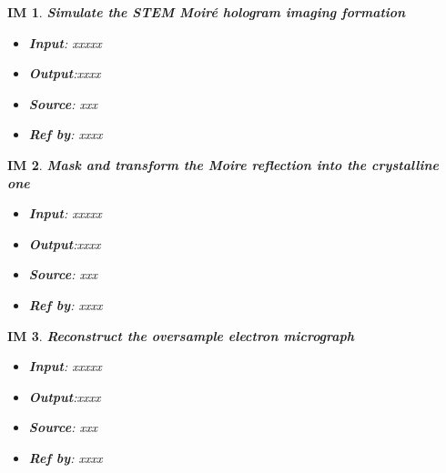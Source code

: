 \documentclass[12pt]{article}
\newtheorem{IM}{IM}
\begin{document}
\begin{IM}
\label{IM_3}
\noindent\colorbox{shadecolorIM}{\normalfont \textbf{Simulate the STEM Moir{\'e} hologram imaging formation}}
\normalfont
\begin{itemize}
\item \textbf{Input}: xxxxx
\item \textbf{Output}:xxxx

\item \textbf{Source}: xxx
\item \textbf{Ref by}: xxxx
\end{itemize}
\end{IM}

\begin{IM}
\label{IM_4}
\noindent\colorbox{shadecolorIM}{\normalfont \textbf{Mask and transform the Moire reflection into the crystalline one}}
\normalfont
\begin{itemize}
\item \textbf{Input}: xxxxx
\item \textbf{Output}:xxxx

\item \textbf{Source}: xxx
\item \textbf{Ref by}: xxxx
\end{itemize}
\end{IM}

\begin{IM}
\label{IM_5}
\noindent\colorbox{shadecolorIM}{\normalfont \textbf{Reconstruct the oversample electron micrograph}}
\normalfont
\begin{itemize}
\item \textbf{Input}: xxxxx
\item \textbf{Output}:xxxx

\item \textbf{Source}: xxx
\item \textbf{Ref by}: xxxx
\end{itemize}
\end{IM}
\end{document}
